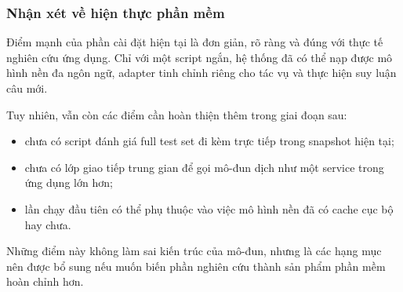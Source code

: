 \subsubsection{Nhận xét về hiện thực phần mềm}

Điểm mạnh của phần cài đặt hiện tại là đơn giản, rõ ràng và đúng với thực tế nghiên cứu
ứng dụng. Chỉ với một script ngắn, hệ thống đã có thể nạp được mô hình nền đa ngôn ngữ,
adapter tinh chỉnh riêng cho tác vụ và thực hiện suy luận câu mới.

Tuy nhiên, vẫn còn các điểm cần hoàn thiện thêm trong giai đoạn sau:
\begin{itemize}
    \item chưa có script đánh giá full test set đi kèm trực tiếp trong snapshot hiện tại;
    \item chưa có lớp giao tiếp trung gian để gọi mô-đun dịch như một service trong ứng
    dụng lớn hơn;
    \item lần chạy đầu tiên có thể phụ thuộc vào việc mô hình nền đã có cache cục bộ hay
    chưa.
\end{itemize}

Những điểm này không làm sai kiến trúc của mô-đun, nhưng là các hạng mục nên được bổ
sung nếu muốn biến phần nghiên cứu thành sản phẩm phần mềm hoàn chỉnh hơn.

